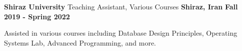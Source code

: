 \begin{cventries}
{    \cventry
    {\textbf{Shiraz University}} %
    {Teaching Assistant, Various Courses} %
    {\textbf{Shiraz, Iran}} %
    {\textbf{Fall 2019 - Spring 2022}} %
    {
      \begin{cvitems}
        \item Assisted in various courses including Database Design Principles, Operating Systems Lab, Advanced Programming, and more.
      \end{cvitems}
    }
}

\end{cventries}
